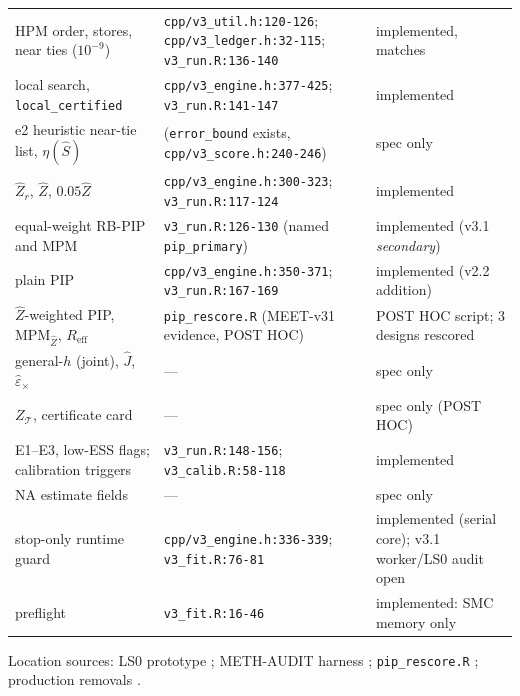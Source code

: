 {\begin{xltabular}{\linewidth}{@{}>{\raggedright\arraybackslash}p{3.3cm}>{\raggedright\arraybackslash}X>{\raggedright\arraybackslash}p{3.1cm}@{}}
HPM order, stores, near ties ($10^{-9}$) & \texttt{cpp/v3\_util.h:120-126}; \texttt{cpp/v3\_ledger.h:32-115}; \texttt{v3\_run.R:136-140} & implemented, matches\\
local search, \texttt{local\_certified} & \texttt{cpp/v3\_engine.h:377-425}; \texttt{v3\_run.R:141-147} & implemented\\
e2 heuristic near-tie list, $\eta(\hat S)$ & (\texttt{error\_bound} exists, \texttt{cpp/v3\_score.h:240-246}) & spec only\\
$\hat Z_r$, $\hat Z$, $0.05\hat Z$ & \texttt{cpp/v3\_engine.h:300-323}; \texttt{v3\_run.R:117-124} & implemented\\
equal-weight RB-PIP and MPM & \texttt{v3\_run.R:126-130} (named \texttt{pip\_primary}) & implemented (v3.1 \emph{secondary})\\
plain PIP & \texttt{cpp/v3\_engine.h:350-371}; \texttt{v3\_run.R:167-169} & implemented (v2.2 addition)\\
$\hat Z$-weighted PIP, $\mathrm{MPM}_{\hat Z}$, $R_{\mathrm{eff}}$ & \texttt{pip\_rescore.R} (MEET-v31 evidence, POST HOC) & POST HOC script; 3 designs rescored\\
general-$h$ (joint), $\hat J$, $\hat\varepsilon_\times$ & --- & spec only\\
$Z_{\mathcal T}$, certificate card & --- & spec only (POST HOC)\\
E1--E3, low-ESS flags; calibration triggers & \texttt{v3\_run.R:148-156}; \texttt{v3\_calib.R:58-118} & implemented\\
NA estimate fields & --- & spec only\\
stop-only runtime guard & \texttt{cpp/v3\_engine.h:336-339}; \texttt{v3\_fit.R:76-81} & implemented (serial core); v3.1 worker/LS0 audit open\\
preflight & \texttt{v3\_fit.R:16-46} & implemented: SMC memory only\\
\bottomrule
\end{xltabular}
}
Location sources: LS0 prototype  ;
METH-AUDIT harness ; \texttt{pip\_rescore.R} ;
production removals .

